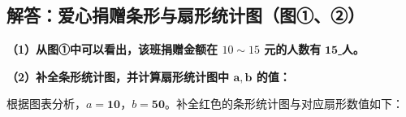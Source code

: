 ﻿%

\subsection{解答：爱心捐赠条形与扇形统计图（图①、②）}

\vspace{0.6cm}

\textbf{（1）从图①中可以看出，该班捐赠金额在 $10\sim 15$ 元的人数有} \underline{\quad $\textbf{15}$ \quad} \textbf{人。}

\vspace{0.4cm}

\textbf{（2）补全条形统计图，并计算扇形统计图中 $\boldsymbol{a}, \boldsymbol{b}$ 的值：}

根据图表分析，$a = \boldsymbol{10}$，$b = \boldsymbol{50}$。补全红色的条形统计图与对应扇形数值如下：

\vspace{0.6cm}

